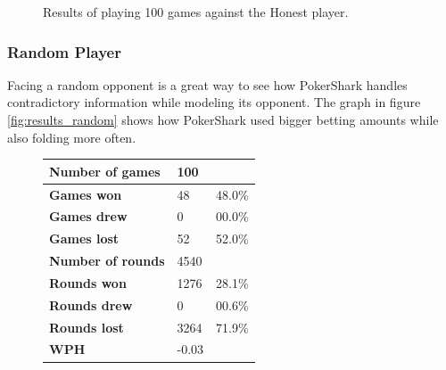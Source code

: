 \begin{figure}[H]
\begin{minipage}{\textwidth}
\begin{minipage}{0.5\textwidth}
        \end{minipage}
    \end{minipage}
    \caption{Results of playing 100 games against the Honest player.}
    \label{fig:results_honest}
\end{figure}


\subsubsection{Random Player}
Facing a random opponent is a great way to see how PokerShark handles contradictory information while modeling its opponent. The graph in figure \ref{fig:results_random} shows how PokerShark used bigger betting amounts while also folding more often. 

\begin{figure}[H]
    \centering
    \begin{minipage}{\textwidth}
        \begin{minipage}{0.40\textwidth}
            \begin{tabular}{|l|l|l|}
                \hline
                \textbf{Number of games}  & 100   &        \\ \hline
                \textbf{Games won}        & 48    & 48.0\% \\ \hline
                \textbf{Games drew}       & 0     & 00.0\%  \\ \hline
                \textbf{Games lost}       & 52    & 52.0\% \\ \hline
                \textbf{Number of rounds} & 4540  &        \\ \hline
                \textbf{Rounds won}       & 1276  & 28.1\% \\ \hline
                \textbf{Rounds drew}      & 0     & 00.6\%  \\ \hline
                \textbf{Rounds lost}      & 3264  & 71.9\% \\ \hline
                \textbf{WPH}              & -0.03  &        \\ \hline
            \end{tabular}
        \end{minipage}
        \hspace{0.05\textwidth}
        \begin{minipage}{0.5\textwidth}

\end{minipage}
\end{minipage}
\end{figure}
